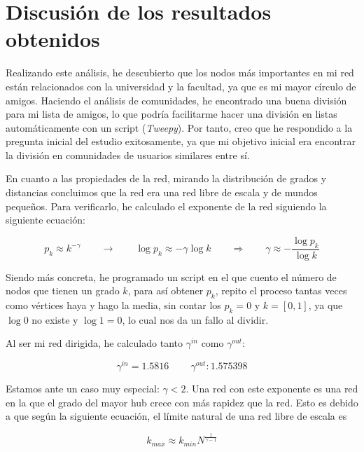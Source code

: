 \documentclass[10pt,a4paper,spanish]{article}
\numberwithin{equation}{section} %
\numberwithin{figure}{section} %
\numberwithin{table}{section} %
\begin{document}
\section{Discusión de los resultados obtenidos}

Realizando este análisis, he descubierto que los nodos más importantes en mi red están relacionados con la universidad y la facultad, ya que es mi mayor círculo de amigos. Haciendo el análisis de comunidades, he encontrado una buena división para mi lista de amigos, lo que podría facilitarme hacer una división en listas automáticamente con un script (\textit{Tweepy}). Por tanto, creo que he respondido a la pregunta inicial del estudio exitosamente, ya que mi objetivo inicial era encontrar la división en comunidades de usuarios similares entre sí. 

En cuanto a las propiedades de la red, mirando la distribución de grados y distancias concluimos que la red era una red libre de escala y de mundos pequeños. Para verificarlo, he calculado el exponente de la red siguiendo la siguiente ecuación:

\begin{displaymath}
p_k \approx k^{- \gamma} \qquad \longrightarrow \qquad \log p_k \approx - \gamma \log k \qquad \Longrightarrow \qquad \gamma \approx - \frac{\log p_k}{\log k}
\end{displaymath}

Siendo más concreta, he programado un script en el que cuento el número de nodos que tienen un grado $k$, para así obtener $p_k$, repito el proceso tantas veces como vértices haya y hago la media, sin contar los $p_k = 0$ y $k = [0,1]$, ya que $\log 0$ no existe y $\log 1 = 0$, lo cual nos da un fallo al dividir.

Al ser mi red dirigida, he calculado tanto $\gamma^{in}$ como $\gamma^{out}$:

\begin{displaymath}
    \gamma^{in} = 1.5816 \qquad\ \gamma^{out}:  1.575398
\end{displaymath}

Estamos ante un caso muy especial: $\gamma < 2$. Una red con este exponente es una red en la que el grado del mayor hub crece con más rapidez que la red. Esto es debido a que según la siguiente ecuación, el límite natural de una red libre de escala es

\begin{displaymath}
    k_{max} \approx k_{min} N^{\frac{1}{\gamma - 1}}
\end{displaymath}
\end{document}
